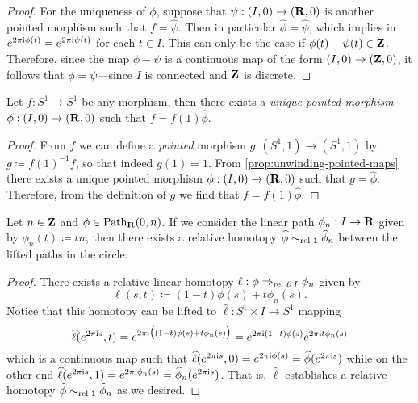 \begin{proof}
    For the uniqueness of \(\phi\), suppose that \(\psi: (I, 0) \to (\mathbf{R}, 0)\) is
    another pointed morphism such that \(f = \widehat \psi\). Then in particular
    \(\widehat \phi = \widehat \psi\), which implies in
    \(e^{2 \pi \text{i} \phi(t)} = e^{2 \pi \text{i} \psi(t)}\) for each \(t \in I\). This can
    only be the case if \(\phi(t) - \psi(t) \in \mathbf{Z}\). Therefore, since the map
    \(\phi - \psi\) is a continuous map of the form \((I, 0) \to (\mathbf{Z}, 0)\), it
    follows that \(\phi = \psi\)---since \(I\) is connected and \(\mathbf{Z}\) is discrete.
\end{proof}

\begin{theorem}
    \label{thm:unwinding-maps}
    Let \(f: S^1 \to S^1\) be any morphism, then there exists a \emph{unique pointed
        morphism} \(\phi: (I, 0) \to (\mathbf{R}, 0)\) such that \(f = f(1) \widehat \phi\).
\end{theorem}

\begin{proof}
    From \(f\) we can define a \emph{pointed} morphism \(g: (S^1, 1) \to (S^1, 1)\)
    by \(g \coloneq f(1)^{-1} f\), so that indeed \(g(1) = 1\). From
    \cref{prop:unwinding-pointed-maps} there exists a unique pointed morphism
    \(\phi: (I, 0) \to (\mathbf{R}, 0)\) such that \(g = \widehat \phi\). Therefore, from
    the definition of \(g\) we find that \(f = f(1) \widehat \phi\).
\end{proof}

\begin{lemma}
    \label{lem:path-to-int-is-htpy-turns-on-circle}
    Let \(n \in \mathbf{Z}\) and \(\phi \in \operatorname{Path}_{\mathbf{R}}(0, n)\). If we consider the linear
    path \(\phi_n: I \to \mathbf{R}\) given by \(\phi_n(t) \coloneq t n\), then there
    exists a relative homotopy \(\widehat \phi \sim_{\text{rel }{1}} \widehat \phi_n\)
    between the lifted paths in the circle.
\end{lemma}

\begin{proof}
    There exists a relative linear homotopy \(\ell: \phi \Rightarrow_{\text{rel }{\operatorname{\partial}I}} \phi_n\)
    given by
    \[
        \ell(s, t) \coloneq (1 - t) \phi(s) + t \phi_n(s).
    \]
    Notice that this homotopy can be lifted to
    \(\widehat \ell: S^1 \times I \to S^1\) mapping
    \[
        \widehat\ell(e^{2 \pi \text{i} s}, t)
        = e^{2 \pi \text{i} \big( (1-t)\phi(s) + t \phi_n(s) \big)}
        = e^{2 \pi \text{i} (1-t)\phi(s)} e^{2 \pi \text{i} t \phi_n(s)}
    \]
    which is a continuous map such that
    \(\widehat \ell(e^{2 \pi \text{i} s}, 0) = e^{2 \pi \text{i} \phi(s)} = \widehat
    \phi(e^{2 \pi \text{i} s})\) while on the other end
    \(\widehat \ell(e^{2 \pi \text{i} s}, 1) = e^{2 \pi \text{i} \phi_n(s)} = \widehat
    \phi_n(e^{2 \pi \text{i} s})\). That is, \(\widehat \ell\) establishes a relative
    homotopy \(\widehat \phi \sim_{\text{rel }{1}} \widehat \phi_n\) as we desired.
\end{proof}

